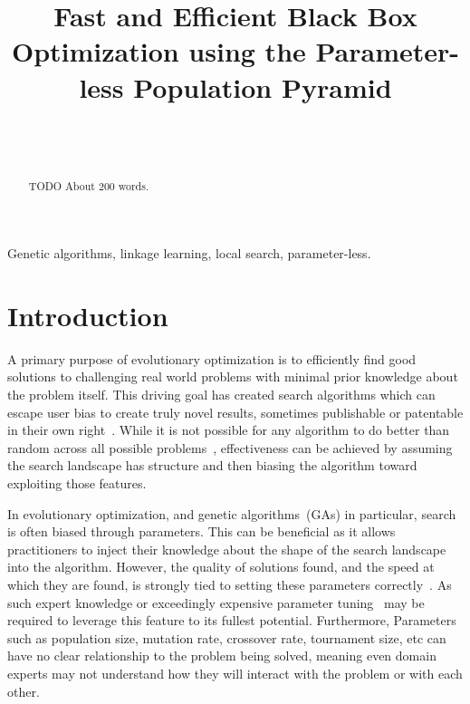 \documentclass[twoside]{article}
\begin{document}
\title{\bf Fast and Efficient Black Box Optimization using the Parameter-less Population Pyramid}  

\author{ \hfill {}\\ 
\AND
        \hfill {}\\
}

\maketitle

\begin{abstract}

TODO About 200 words.

\end{abstract}

\begin{keywords}

Genetic algorithms, 
linkage learning,
local search,
parameter-less.

\end{keywords}

\section{Introduction}
A primary purpose of evolutionary optimization is to efficiently find good solutions
to challenging real world problems with minimal prior knowledge about the problem itself.
This driving goal has created search algorithms which can escape user bias to create
truly novel results, sometimes publishable or patentable in their own right~\citep{kannappan:2014:humies}.
While it is not possible for any algorithm to do better than random across all possible
problems~\citep{Wolpert:1997:nfl}, effectiveness can be achieved by assuming the search
landscape has structure and then biasing the algorithm toward exploiting those features.

In evolutionary optimization, and genetic algorithms~(GAs) in particular, search is often
biased through parameters. This can be beneficial as it allows practitioners to inject their
knowledge about the shape of the search landscape into the algorithm.
However, the quality of solutions found, and the speed at which they are found, is strongly tied to setting these parameters
correctly~\citep{goldberg:1991:gasize}. As such expert knowledge or exceedingly
expensive parameter tuning~\citep{grefenstette:1986:optimalga} may be required to leverage
this feature to its fullest potential. Furthermore,  Parameters such as population size, mutation rate, crossover
rate, tournament size, etc can have no clear relationship to the problem being solved, meaning even
domain experts may not understand how they will interact with the problem or with each other.
\end{document}
